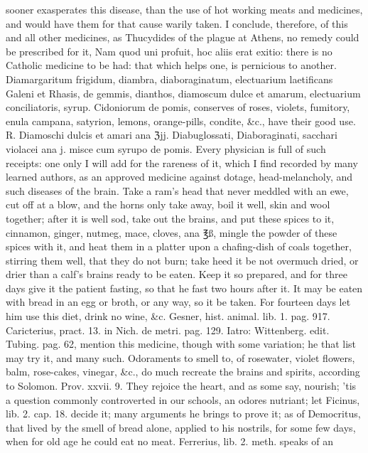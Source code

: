 sooner exasperates this disease, than the use of hot working meats and
medicines, and would have them for that cause warily taken. I conclude,
therefore, of this and all other medicines, as Thucydides of the plague
at Athens, no remedy could be prescribed for it, Nam quod uni profuit,
hoc aliis erat exitio: there is no Catholic medicine to be had: that
which helps one, is pernicious to another.
Diamargaritum frigidum, diambra, diaboraginatum, electuarium
laetificans Galeni et Rhasis, de gemmis, dianthos, diamoscum dulce et
amarum, electuarium conciliatoris, syrup. Cidoniorum de pomis,
conserves of roses, violets, fumitory, enula campana, satyrion, lemons,
orange-pills, condite, \&c., have their good use.
℞. Diamoschi dulcis et amari ana ℨjj. Diabuglossati,
Diaboraginati, sacchari violacei ana j. misce cum syrupo de pomis.
Every physician is full of such receipts: one only I will add for the
rareness of it, which I find recorded by many learned authors, as an
approved medicine against dotage, head-melancholy, and such diseases of
the brain. Take a ram's head that never meddled with an ewe, cut
off at a blow, and the horns only take away, boil it well, skin and
wool together; after it is well sod, take out the brains, and put these
spices to it, cinnamon, ginger, nutmeg, mace, cloves, ana ℥ß, mingle
the powder of these spices with it, and heat them in a platter upon a
chafing-dish of coals together, stirring them well, that they do not
burn; take heed it be not overmuch dried, or drier than a calf's brains
ready to be eaten. Keep it so prepared, and for three days give it the
patient fasting, so that he fast two hours after it. It may be eaten
with bread in an egg or broth, or any way, so it be taken. For fourteen
days let him use this diet, drink no wine, \&c. Gesner, hist. animal.
lib. 1. pag. 917. Caricterius, pract. 13. in Nich. de metri. pag. 129.
Iatro: Wittenberg. edit. Tubing. pag. 62, mention this medicine, though
with some variation; he that list may try it, and many such.
Odoraments to smell to, of rosewater, violet flowers, balm, rose-cakes,
vinegar, \&c., do much recreate the brains and spirits, according to
Solomon. Prov. xxvii. 9. They rejoice the heart, and as some say,
nourish; 'tis a question commonly controverted in our schools, an
odores nutriant; let Ficinus, lib. 2. cap. 18. decide it; many
arguments he brings to prove it; as of Democritus, that lived by the
smell of bread alone, applied to his nostrils, for some few days, when
for old age he could eat no meat. Ferrerius, lib. 2. meth. speaks of an
